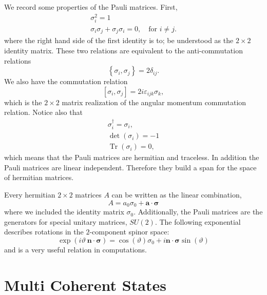 \documentclass[11pt]{book}
\renewcommand{\vec}[1]{\bm{#1}}
\newcommand{\comm}[2]{\left[#1,#2\right]}
\newcommand{\acomm}[2]{\left\{#1,#2\right\}}
\DeclareMathOperator{\Tr}{Tr}   %
\begin{document}
We record some properties of the Pauli matrices. First,
\begin{eqnarray}
  \sigma_i^2 =1  \\
  \sigma_i \sigma_j + \sigma_j \sigma_i = 0, \quad \text{for } i\neq j.
\end{eqnarray}
where the right hand side of the first identity is to; be understood as the $2\times 2$ identity matrix. These two relations are equivalent to the anti-commutation relations 
\begin{equation}
  \acomm{\sigma_i}{\sigma_j} = 2 \delta_{ij}.
\end{equation}
We also have the commutation relation 
\begin{equation}
  \comm{\sigma_i}{\sigma_j} = 2i \varepsilon_{ijk} \sigma_k,
\end{equation}
which is the $2\times 2$ matrix realization of the angular momentum commutation relation. Notice also that 
\begin{eqnarray}
  \sigma_i^\dagger = \sigma_i,\\
  \det(\sigma_i) = -1\\
  \Tr(\sigma_i) = 0,
\end{eqnarray}
which means that the Pauli matrices are hermitian and traceless. In addition the Pauli matrices are linear independent. Therefore they build a span for the space of hermitian matrices. 

Every hermitian $2\times 2$ matrices $A$ can be written as the linear combination,
 \begin{equation}
   A = a_0 \sigma_0 + \vec{a}\cdot \vec{\sigma}
 \end{equation}
where we included the identity matrix $\sigma_0$.
Additionally, the Pauli matrices are the generators for special unitary matrices, $SU(2)$.
The following exponential describes rotations in the $2$-component spinor space:
        \begin{equation}
              \exp(i \vartheta \: \vec{n} \cdot \vec{\sigma} ) = \cos(\vartheta) \sigma_0 + i \vec{n} \cdot \vec{\sigma} \sin(\vartheta)
        \end{equation}
      and is a very useful relation in computations.

\clearpage
\newpage

\chapter{Multi Coherent States}
\end{document}

